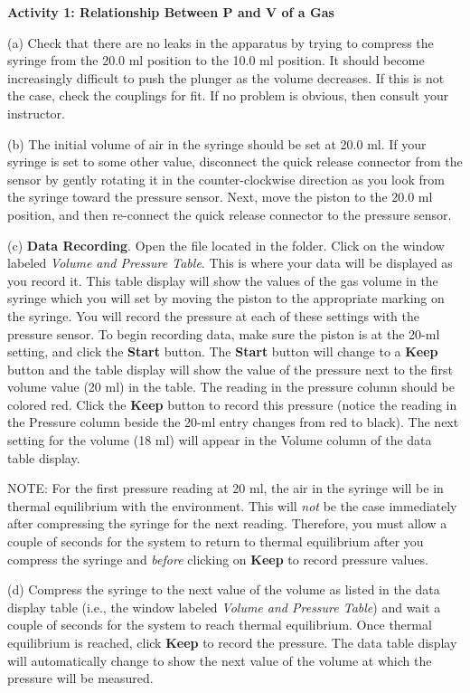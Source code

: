 \textbf{Activity 1: Relationship Between P and V of a Gas}

(a) Check that there are no leaks in the apparatus by trying to compress
the syringe from the 20.0 ml position to the 10.0 ml position. It should become
increasingly difficult to push the plunger as the volume decreases. If this
is not the case, check the couplings for fit. If no problem is obvious, then
consult your instructor. 
\vspace{20mm}

(b) The initial volume of air in the syringe should be set at 20.0 ml. If your
syringe is set to some other value, disconnect the quick release connector from
the sensor by gently rotating it in the counter-clockwise direction as you look
from the syringe toward the pressure sensor. Next, move the piston to the 20.0
ml position, and then re-connect the quick release connector to the pressure
sensor. 

(c) \textbf{Data Recording}. Open the file  located in the 
\filename{\coursefolder} folder. Click on the window labeled \textit{Volume
and Pressure Table}. This is where your data will be displayed as you record
it. This table display will show the values of the gas volume in the syringe
which you will set by moving the piston to the appropriate marking on the syringe.
You will record the pressure at each of these settings with the pressure sensor.
To begin recording data, make sure the piston is at the 20-ml setting, and click
the {\bf Start} button. The {\bf Start} button will change to a {\bf Keep} button and the table
display will show the value of the pressure next to the first volume value (20
ml) in the table. The reading in the pressure column should be colored red.
Click the {\bf Keep} button to record this pressure (notice the reading in the Pressure
column beside the 20-ml entry changes from red to black). The next setting for
the volume (18 ml) will appear in the Volume column of the data table display.

NOTE: For the first pressure reading at 20 ml, the air in the syringe will be
in thermal equilibrium with the environment. This will \textit{not} be the case immediately
after compressing the syringe for the next reading. Therefore, you must allow
a couple of seconds for the system to return to thermal equilibrium after you 
compress the syringe and \textit{before} clicking on {\bf Keep} to record pressure values. 

(d) Compress the syringe to the next value of the volume as listed in the data
display table (i.e., the window labeled \textit{Volume and Pressure Table})
and wait a couple of seconds for the system to reach thermal equilibrium. Once 
thermal equilibrium is reached, click {\bf Keep} to record the pressure. The data 
table display will automatically change to show the next value of the volume 
at which the pressure will be measured. 

